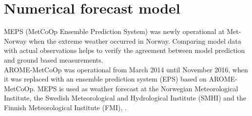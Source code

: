 \section{Numerical forecast model} \label{sec:MEPS}
MEPS (MetCoOp Ensemble Prediction System) was newly operational at Met-Norway when the extreme weather occurred in Norway. Comparing model data with actual observations helps to verify the agreement between model prediction and ground based measurements. 
\\
AROME-MetCoOp was operational from March 2014 until November 2016, when it was replaced with an ensemble prediction system (EPS) based on AROME-MetCoOp.
MEPS is used as weather forecast at the Norwegian Meteorological Institute, the Swedish Meteorological and Hydrological Institute (SMHI) and the Finnish Meteorological Institute (FMI), \citep{muller_arome-metcoop:_2017, koltzow_metcoop_2017}.
